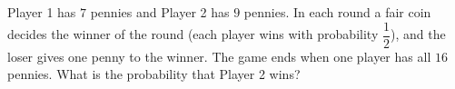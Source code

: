 Player 1 has $7$ pennies and Player 2 has $9$ pennies. In each round a fair coin decides the winner of the round (each player wins with probability $\dfrac{1}{2}$), and the loser gives one penny to the winner. The game ends when one player has all $16$ pennies. What is the probability that Player 2 wins?
